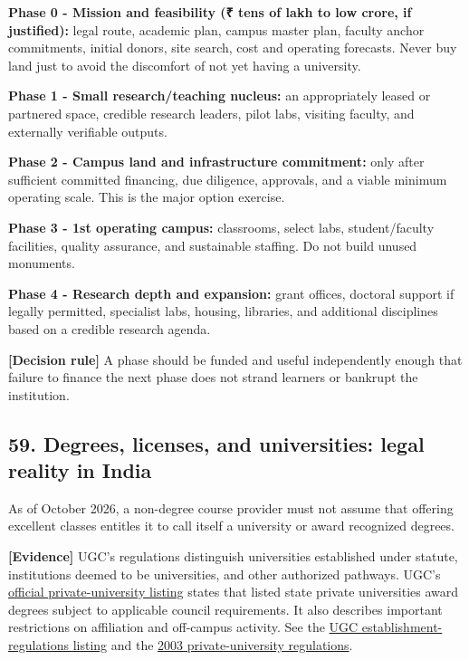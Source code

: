 \textbf{Phase 0 - Mission and feasibility (\textnormal{₹} tens of lakh to low crore, if justified):} legal route, academic plan, campus master plan, faculty anchor commitments, initial donors, site search, cost and operating forecasts. Never buy land just to avoid the discomfort of not yet having a university.

\textbf{Phase 1 - Small research/\allowbreak teaching nucleus:} an appropriately leased or partnered space, credible research leaders, pilot labs, visiting faculty, and externally verifiable outputs.

\textbf{Phase 2 - Campus land and infrastructure commitment:} only after sufficient committed financing, due diligence, approvals, and a viable minimum operating scale. This is the major option exercise.

\textbf{Phase 3 - 1st operating campus:} classrooms, select labs, student/\allowbreak faculty facilities, quality assurance, and sustainable staffing. Do not build unused monuments.

\textbf{Phase 4 - Research depth and expansion:} grant offices, doctoral support if legally permitted, specialist labs, housing, libraries, and additional disciplines based on a credible research agenda.

\textbf{\textbf{[Decision rule]}} A phase should be funded and useful independently enough that failure to finance the next phase does not strand learners or bankrupt the institution.

\subsection{59. Degrees, licenses, and universities: legal reality in India}

As of October 2026, a non-degree course provider must not assume that offering excellent classes entitles it to call itself a university or award recognized degrees.

\textbf{\textbf{[Evidence]}} UGC's regulations distinguish universities established under statute, institutions deemed to be universities, and other authorized pathways. UGC's \href{https://www.ugc.gov.in/\allowbreak universitydetails/universityother?type=0wBmFB1Rb4JGVzq9UP\%2FiOg\%3D\%3D}{official private-university listing} states that listed state private universities award degrees subject to applicable council requirements. It also describes important restrictions on affiliation and off-campus activity. See the \href{https://www.ugc.gov.in/\allowbreak regulations/UGC_Regulations_university}{UGC establishment-regulations listing} and the \href{https://indiacode.ecourtsindia.com/\allowbreak rules/university-grants-commission-establishment-of-and-maintenance-of-705bb06f/}{2003 private-university regulations}.

